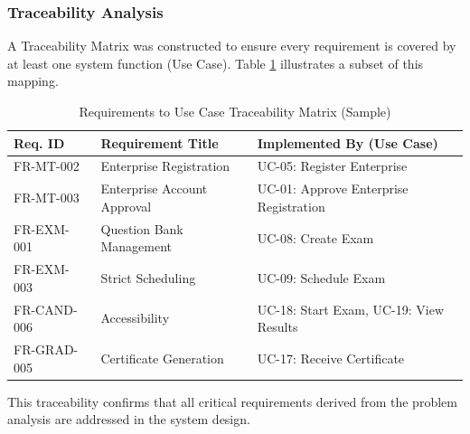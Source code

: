 \subsubsection{Traceability Analysis}
A Traceability Matrix was constructed to ensure every requirement is covered by at least one system function (Use Case). Table \ref{tab:traceability-matrix} illustrates a subset of this mapping.

\begin{table}[H]
\centering
\caption{Requirements to Use Case Traceability Matrix (Sample)}
\label{tab:traceability-matrix}
\begin{tabular}{|l|l|l|}
\hline
\textbf{Req. ID} & \textbf{Requirement Title} & \textbf{Implemented By (Use Case)} \\ \hline
FR-MT-002 & Enterprise Registration & UC-05: Register Enterprise \\ \hline
FR-MT-003 & Enterprise Account Approval & UC-01: Approve Enterprise Registration \\ \hline
FR-EXM-001 & Question Bank Management & UC-08: Create Exam \\ \hline
FR-EXM-003 & Strict Scheduling & UC-09: Schedule Exam \\ \hline
FR-CAND-006 & Accessibility & UC-18: Start Exam, UC-19: View Results \\ \hline
FR-GRAD-005 & Certificate Generation & UC-17: Receive Certificate \\ \hline
\end{tabular}
\end{table}

This traceability confirms that all critical requirements derived from the problem analysis are addressed in the system design.
